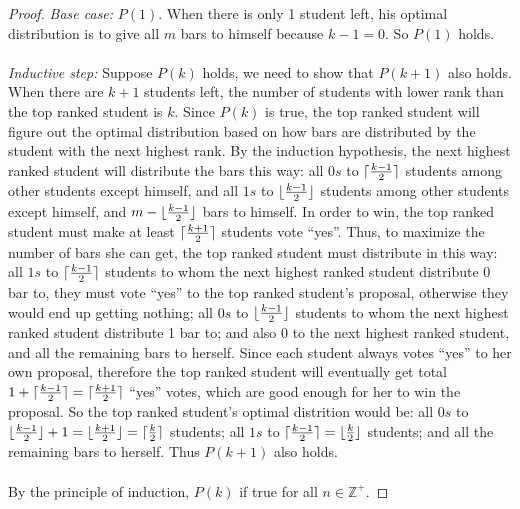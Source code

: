 \documentclass[11pt]{article}
\DeclarePairedDelimiter\ceil{\lceil}{\rceil}
\DeclarePairedDelimiter\floor{\lfloor}{\rfloor}
\begin{document}
\begin{proof}
  \emph{Base case:} $P(1)$. When there is only 1 student left, his
  optimal distribution is to give all $m$ bars to himself because
  $k-1=0$. So $P(1)$ holds.\\\\
  \emph{Inductive step:} Suppose $P(k)$ holds, we need to show that
  $P(k+1)$ also holds. When there are $k+1$ students left, the number
  of students with lower rank than the top ranked student is
  $k$. Since $P(k)$ is true, the top ranked student will figure out
  the optimal distribution based on how bars are distributed by the student
  with the next highest rank. By the induction hypothesis, the next
  highest ranked student will distribute the bars this way: all $0s$
  to $\ceil{\frac{k-1}{2}}$ students among other students except
  himself, and all $1s$ to $\floor{\frac{k-1}{2}}$
  students among other students except himself, and
  $m-\floor{\frac{k-1}{2}}$ bars to himself. In order to win,
  the top ranked student must make at least $\ceil{\frac{k+1}{2}}$
  students vote ``yes''. Thus, to maximize the number of bars she can
  get, the top ranked student must distribute in this way: all $1s$ to
  $\ceil{\frac{k-1}{2}}$ students to whom the next highest ranked
  student distribute 0 bar to, they must vote ``yes'' to the top
  ranked student's proposal, otherwise they would end up getting
  nothing; all $0s$ to $\floor{\frac{k-1}{2}}$ students to whom the
  next highest ranked student distribute 1 bar to; and also $0$ to the
  next highest ranked student, and all the remaining bars to
  herself. Since each student always votes ``yes'' 
  to her own proposal, therefore the top ranked student will eventually get
  total $1+\ceil{\frac{k-1}{2}} = \ceil{\frac{k+1}{2}}$ ``yes'' votes,
  which are good enough for her to win the proposal. So the top ranked
  student's optimal distrition would be: all $0s$ to
  $\floor{\frac{k-1}{2}} + 1 = \floor{\frac{k+1}{2}} =
  \ceil{\frac{k}{2}}$ students; all $1s$ to $\ceil{\frac{k-1}{2}} = 
  \floor{\frac{k}{2}}$ students; and all the remaining bars to
  herself. Thus $P(k+1)$ also holds. \\\\
  By the principle of induction, $P(k)$ if true for all $n \in
  \mathbb{Z}^+$.  
\end{proof}
\end{document}
